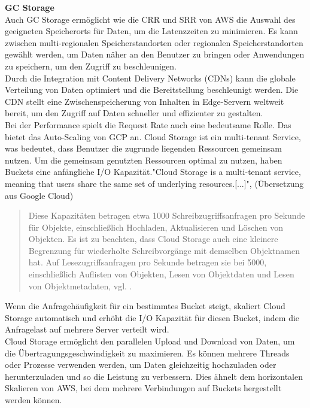\newpage

\textbf{GC Storage}\\

Auch GC Storage ermöglicht wie die CRR und SRR von AWS die Auswahl des geeigneten Speicherorts für Daten, um die Latenzzeiten zu minimieren. Es kann zwischen multi-regionalen Speicherstandorten oder regionalen Speicherstandorten gewählt werden, um Daten näher an den Benutzer zu bringen oder Anwendungen zu speichern, um den Zugriff zu beschleunigen.\\ 

Durch die Integration mit Content Delivery Networks (CDNs) kann die globale Verteilung von Daten optimiert und die Bereitstellung beschleunigt werden. Die CDN stellt eine Zwischenspeicherung von Inhalten in Edge-Servern weltweit bereit, um den Zugriff auf Daten schneller und effizienter zu gestalten.\\

Bei der Performance spielt die Request Rate auch eine bedeutsame Rolle. Das bietet das Auto-Scaling von GCP an. Cloud Storage ist ein multi-tenant Service, was bedeutet, dass Benutzer die zugrunde liegenden Ressourcen gemeinsam nutzen. Um die gemeinsam genutzten Ressourcen optimal zu nutzen, haben Buckets eine anfängliche I/O Kapazität."Cloud Storage is a multi-tenant service, meaning that users share the same set of underlying resources.[...]", \cite{gcp-autoscale} (Übersetzung aus Google Cloud)

 \begin{quote}
 	Diese Kapazitäten betragen etwa 1000 Schreibzugriffsanfragen pro Sekunde für Objekte, einschließlich Hochladen, Aktualisieren und Löschen von Objekten. Es ist zu beachten, dass Cloud Storage auch eine kleinere Begrenzung für wiederholte Schreibvorgänge mit demselben Objektnamen hat. Auf Lesezugriffsanfragen pro Sekunde betragen sie bei 5000, einschließlich Auflisten von Objekten, Lesen von Objektdaten und Lesen von Objektmetadaten, vgl. \cite{gcp-autoscale}.
 \end{quote}
 
 Wenn die Anfragehäufigkeit für ein bestimmtes Bucket steigt, skaliert Cloud Storage automatisch und erhöht die I/O Kapazität für diesen Bucket, indem die Anfragelast auf mehrere Server verteilt wird.\\
 
Cloud Storage ermöglicht den parallelen Upload und Download von Daten, um die Übertragungsgeschwindigkeit zu maximieren. Es können mehrere Threads oder Prozesse verwenden werden, um Daten gleichzeitig hochzuladen oder herunterzuladen und so die Leistung zu verbessern. Dies ähnelt dem horizontalen Skalieren von AWS, bei dem mehrere Verbindungen auf Buckets hergestellt werden können.\\

